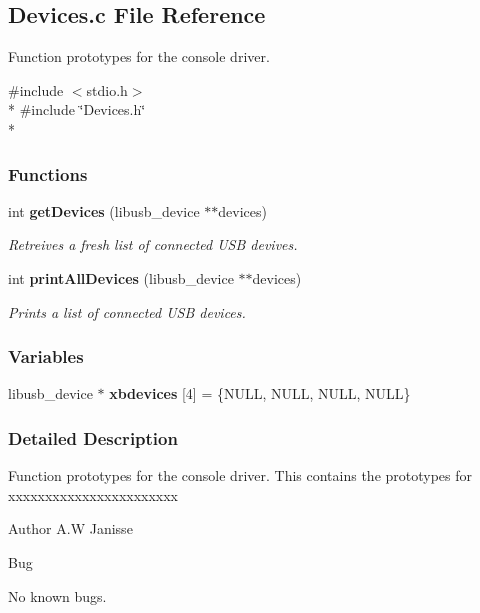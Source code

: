 \subsection{Devices.\-c File Reference}
\label{_devices_8c}


Function prototypes for the console driver.  


{\ttfamily \#include $<$stdio.\-h$>$}\\*
{\ttfamily \#include \char`\"{}Devices.\-h\char`\"{}}\\*
\subsubsection*{Functions}
\begin{DoxyCompactItemize}
\item 
int {\bf get\-Devices} (libusb\-\_\-device $\ast$$\ast$devices)
\begin{DoxyCompactList}\small\item\em Retreives a fresh list of connected U\-S\-B devives. \end{DoxyCompactList}\item 
int {\bf print\-All\-Devices} (libusb\-\_\-device $\ast$$\ast$devices)
\begin{DoxyCompactList}\small\item\em Prints a list of connected U\-S\-B devices. \end{DoxyCompactList}\end{DoxyCompactItemize}
\subsubsection*{Variables}
\begin{DoxyCompactItemize}
\item 
libusb\-\_\-device $\ast$ {\bfseries xbdevices} [4] = \{N\-U\-L\-L, N\-U\-L\-L, N\-U\-L\-L, N\-U\-L\-L\}\label{_devices_8c_a972cc2e23fa5cd2694d0197fb4ab2daf}

\end{DoxyCompactItemize}


\subsubsection{Detailed Description}
Function prototypes for the console driver. This contains the prototypes for xxxxxxxxxxxxxxxxxxxxxxx

\begin{DoxyAuthor}{Author}
A.\-W Janisse 
\end{DoxyAuthor}
\begin{DoxyRefDesc}{Bug}
\item[{\bf Bug}]No known bugs. \end{DoxyRefDesc}


